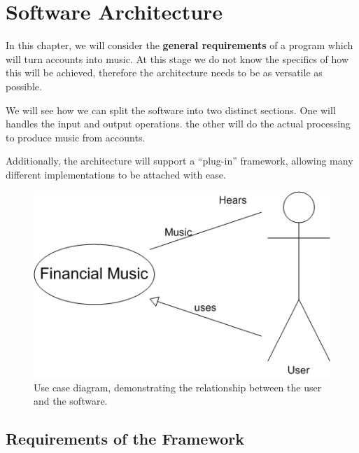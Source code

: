 \chapter{Software Architecture}

In this chapter, we will consider the \textbf{general requirements} of a program which will turn accounts into music. At this stage we do not know the specifics of how this will be achieved, therefore the architecture needs to be as versatile as possible.

We will see how we can split the software into two distinct sections. One will handles the input and output operations. the other will do the actual processing to produce music from accounts.

Additionally, the architecture will support a ``plug-in'' framework, allowing many different implementations to be attached with ease.

\begin{figure}[ht]
\centering
\includegraphics[scale=1.2]{use_case}
\caption{Use case diagram, demonstrating the relationship between the user and the software.}
\label{fig:use_case}
\end{figure}

\section{Requirements of the Framework}

